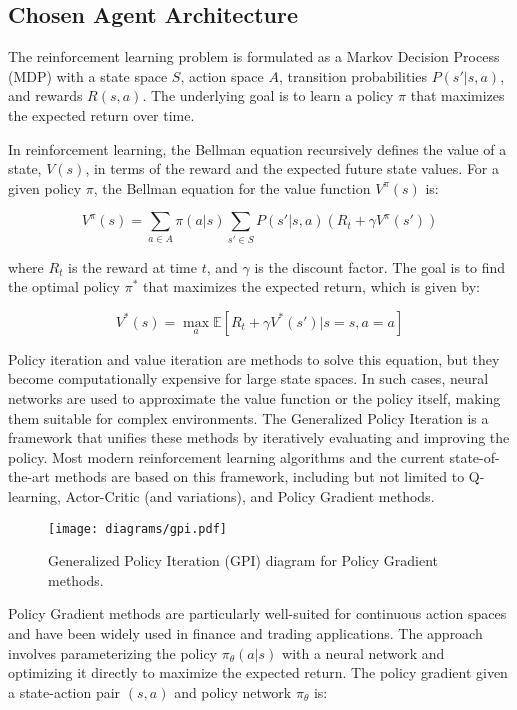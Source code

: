 \documentclass[11pt]{article}
\begin{document}
    \subsection{Chosen Agent Architecture}
    \label{subsec:agent}

    The reinforcement learning problem is formulated as a Markov Decision Process (MDP) with a state space \( S \),
    action space \( A \), transition probabilities \( P(s'|s, a) \), and rewards \( R(s, a) \).
    The underlying goal is to learn a policy \( \pi \) that maximizes the expected return over time.

    In reinforcement learning, the Bellman equation recursively defines the value of a state, \( V(s) \),
    in terms of the reward and the expected future state values.
    For a given policy \( \pi \), the Bellman equation for the value function \( V^{\pi}(s) \) is:

    \[
        V^{\pi}(s) = \sum_{a \in A} \pi(a|s) \sum_{s' \in S} P(s'|s, a) \left( R_t + \gamma V^{\pi}(s') \right)
    \]

    where \( R_t \) is the reward at time \( t \), and \( \gamma \) is the discount factor.
    The goal is to find the optimal policy \( \pi^* \) that maximizes the expected return, which is given by:

    \[
        V^*(s) = \max_a \mathbb{E}[R_t + \gamma V^*(s') | s = s, a = a]
    \]

    Policy iteration and value iteration are methods to solve this equation, but they become computationally expensive for large state spaces.
    In such cases, neural networks are used to approximate the value function or the policy itself, making them suitable for complex environments.
    The Generalized Policy Iteration is a framework that unifies these methods by iteratively evaluating and improving the policy.
    Most modern reinforcement learning algorithms and the current state-of-the-art methods are based on this framework,
    including but not limited to Q-learning, Actor-Critic (and variations), and Policy Gradient methods.

    \begin{figure}[htb]
        \centering
        \texttt{[image: diagrams/gpi.pdf]}
        \caption{Generalized Policy Iteration (GPI) diagram for Policy Gradient methods.}
        \label{fig:gpi}
    \end{figure}

    Policy Gradient methods are particularly well-suited for continuous action spaces and have been widely used in finance and trading applications.
    The approach involves parameterizing the policy \( \pi_\theta(a|s) \) with a neural network and optimizing it directly to maximize the expected return.
    The policy gradient given a state-action pair \( (s, a) \) and policy network \( \pi_\theta \) is:
\end{document}
